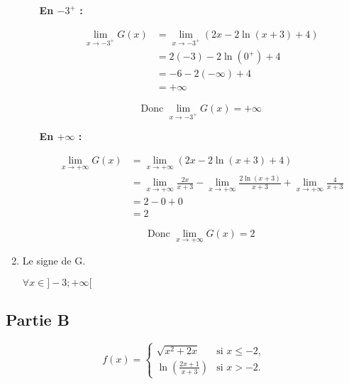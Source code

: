 \documentclass[12pt,a4paper]{article}
\begin{document}
\begin{enumerate}
\begin{enumerate}
\textbf{En \( -3^+ \) :}

\begin{align*}
\lim_{x \to -3^+} G(x) &= \lim_{x \to -3^+} \left( 2x - 2\ln(x+3) + 4 \right) \\
&= 2(-3) - 2\ln(0^+) + 4 \\
&= -6 - 2(-\infty) + 4 \\
&= +\infty
\end{align*}

\[
\text{Donc } \lim_{x \to -3^+} G(x) = +\infty
\]

\textbf{En \( +\infty \) :}

\begin{align*}
\lim_{x \to +\infty} G(x) &= \lim_{x \to +\infty} \left( 2x - 2\ln(x+3) + 4 \right) \\
&= \lim_{x \to +\infty} \frac{2x}{x+3} - \lim_{x \to +\infty} \frac{2\ln(x+3)}{x+3} + \lim_{x \to +\infty} \frac{4}{x+3} \\
&= 2 - 0 + 0 \\
&= 2
\end{align*}

\[
\text{Donc } \lim_{x \to +\infty} G(x) = 2
\]

\begin{center}
\end{center}

\end{enumerate}
\item  Le signe de G.

\(\forall x \in ]-3;+\infty[\)
\end{enumerate}

\subsection*{Partie B}

\[
f(x) =
\begin{cases}
\sqrt{x^2 + 2x} & \text{si } x \leq -2, \\
\ln\left(\frac{2x + 1}{x + 3}\right) & \text{si } x > -2.
\end{cases}
\]
\end{document}
